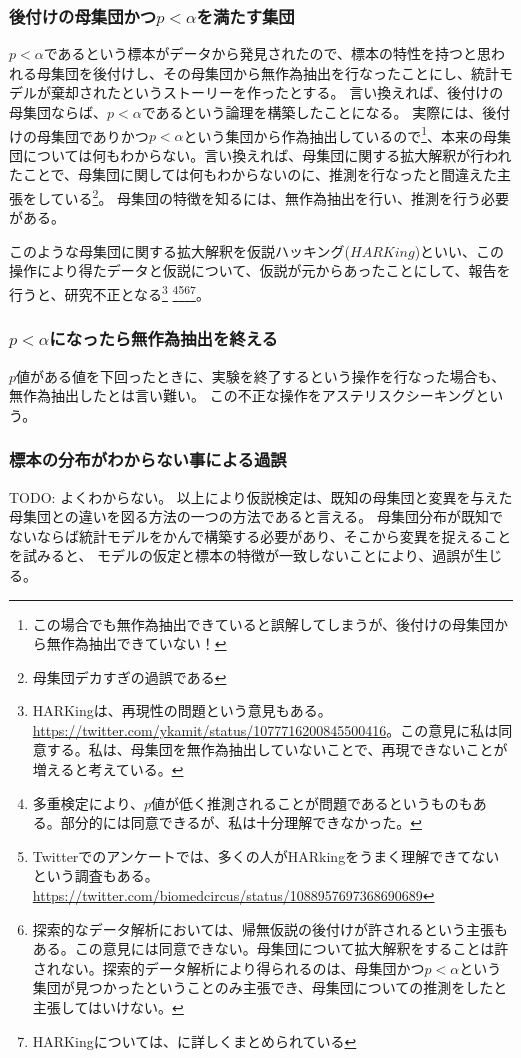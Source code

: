 \documentclass[a4paper,11pt,dvipdfmx]{jsarticle}
\begin{document}
\subsubsection{後付けの母集団かつ$p<\alpha$を満たす集団}
$p<\alpha$であるという標本がデータから発見されたので、標本の特性を持つと思われる母集団を後付けし、その母集団から無作為抽出を行なったことにし、統計モデルが棄却されたというストーリーを作ったとする。
言い換えれば、後付けの母集団ならば、$p<\alpha$であるという論理を構築したことになる。
実際には、後付けの母集団でありかつ$p<\alpha$という集団から作為抽出しているので\footnote{この場合でも無作為抽出できていると誤解してしまうが、後付けの母集団から無作為抽出できていない！}、本来の母集団については何もわからない。言い換えれば、母集団に関する拡大解釈が行われたことで、母集団に関しては何もわからないのに、推測を行なったと間違えた主張をしている\footnote{母集団デカすぎの過誤である}。
母集団の特徴を知るには、無作為抽出を行い、推測を行う必要がある。

このような母集団に関する拡大解釈を仮説ハッキング($HARKing$)といい、この操作により得たデータと仮説について、仮説が元からあったことにして、報告を行うと、研究不正となる\footnote{
    HARKingは、再現性の問題という意見もある。
    \url{https://twitter.com/ykamit/status/1077716200845500416}。この意見に私は同意する。私は、母集団を無作為抽出していないことで、再現できないことが増えると考えている。
}
\footnote{
    多重検定により、$p$値が低く推測されることが問題であるというものもある\cite{池田_功毅2016,中村_大輝2021sp20016}。部分的には同意できるが、私は十分理解できなかった。
}\footnote{
    Twitterでのアンケートでは、多くの人がHARkingをうまく理解できてないという調査もある。
    \url{https://twitter.com/biomedcircus/status/1088957697368690689}
}\footnote{
    探索的なデータ解析においては、帰無仮説の後付けが許されるという主張もある。この意見には同意できない。母集団について拡大解釈をすることは許されない。探索的データ解析により得られるのは、母集団かつ$p<\alpha$という集団が見つかったということのみ主張でき、母集団についての推測をしたと主張してはいけない。
}\footnote{
    HARKingについては、\cite{kerr1998harking}に詳しくまとめられている
}。


\subsubsection{$p<\alpha$になったら無作為抽出を終える}
$p$値がある値を下回ったときに、実験を終了するという操作を行なった場合も、無作為抽出したとは言い難い。
この不正な操作をアステリスクシーキングという。


\subsubsection{標本の分布がわからない事による過誤}
TODO: よくわからない。
以上により仮説検定は、既知の母集団と変異を与えた母集団との違いを図る方法の一つの方法であると言える。
母集団分布が既知でないならば統計モデルをかんで構築する必要があり、そこから変異を捉えることを試みると、
モデルの仮定と標本の特徴が一致しないことにより、過誤が生じる。
\end{document}
